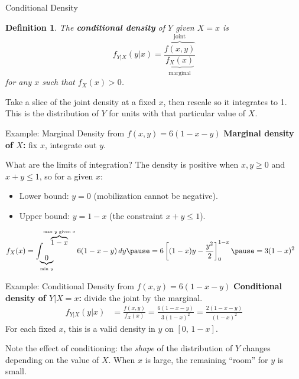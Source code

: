 \documentclass[aspectratio=169, handout, t]{beamer}
\newtheorem{defn}{Definition}
\numberwithin{equation}{section}
\begin{document}
\begin{frame}{Conditional Density}
\begin{defn}
The \textbf{conditional density} of $Y$ given $X=x$ is
$$f_{Y|X}(y|x)=\frac{\overbrace{f(x,y)}^{\text{joint}}}{\underbrace{f_X(x)}_{\text{marginal}}}$$
for any $x$ such that $f_X(x)>0$.
\end{defn}\pause
Take a slice of the joint density at a fixed $x$, then rescale so it integrates to 1. This is the distribution of $Y$ for units with that particular value of $X$.
\end{frame}


\begin{frame}{Example: Marginal Density from $f(x,y)=6(1-x-y)$}
\textbf{Marginal density of $X$:} fix $x$, integrate out $y$.\pause

\vspace{0.2cm}

What are the limits of integration? The density is positive when $x,y\geq 0$ and $x+y\leq 1$, so for a given $x$:
\begin{itemize}
\item Lower bound: $y=0$ (mobilization cannot be negative).\pause
\item Upper bound: $y=1-x$ (the constraint $x+y\leq 1$).\pause
\end{itemize}

\begin{align*}
f_X(x)&=\int_{\underbrace{0}_{\text{min } y}}^{\overbrace{1-x}^{\text{max } y \text{ given } x}}6(1-x-y)\,dy \pause
= 6\left[(1-x)y-\frac{y^2}{2}\right]_0^{1-x} \pause
= 3(1 - x)^2
\end{align*}
\end{frame}


\begin{frame}{Example: Conditional Density from $f(x,y)=6(1-x-y)$}
\textbf{Conditional density of $Y|X=x$:} divide the joint by the marginal.\pause
\begin{align*}
f_{Y|X}(y|x)&=\frac{f(x,y)}{f_X(x)}=\frac{6(1-x-y)}{3(1-x)^2}=\frac{2(1-x-y)}{(1-x)^2}
\end{align*}\pause
For each fixed $x$, this is a valid density in $y$ on $[0,\,1-x]$.\pause

\vspace{0.3cm}

Note the effect of conditioning: the \emph{shape} of the distribution of $Y$ changes depending on the value of $X$. When $x$ is large, the remaining ``room'' for $y$ is small.
\end{frame}
\end{document}
